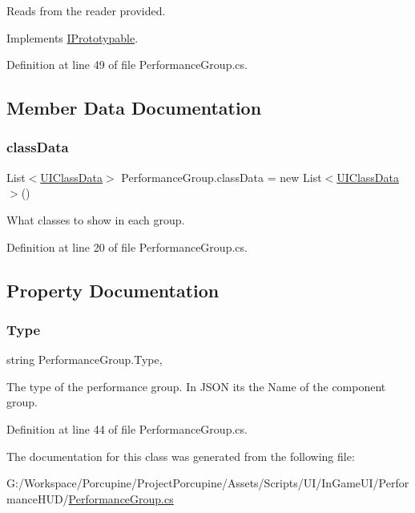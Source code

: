 Reads from the reader provided. 



Implements \hyperlink{interface_i_prototypable_a024d752c4be655a7166db5718f1fad6a}{I\+Prototypable}.



Definition at line 49 of file Performance\+Group.\+cs.



\subsection{Member Data Documentation}
\mbox{\label{class_performance_group_a95898308ffc858a8fc045380952234a7}} 
\subsubsection{\texorpdfstring{class\+Data}{classData}}
{\footnotesize\ttfamily List$<$\hyperlink{struct_u_i_class_data}{U\+I\+Class\+Data}$>$ Performance\+Group.\+class\+Data = new List$<$\hyperlink{struct_u_i_class_data}{U\+I\+Class\+Data}$>$()}



What classes to show in each group. 



Definition at line 20 of file Performance\+Group.\+cs.



\subsection{Property Documentation}
\mbox{\label{class_performance_group_a05385bccfa54530d1232ee250c3df825}} 
\subsubsection{\texorpdfstring{Type}{Type}}
{\footnotesize\ttfamily string Performance\+Group.\+Type\hspace{0.3cm}{\ttfamily [get]}, {\ttfamily [set]}}



The type of the performance group. In J\+S\+ON its the \textquotesingle{}Name\textquotesingle{} of the component group. 



Definition at line 44 of file Performance\+Group.\+cs.



The documentation for this class was generated from the following file\+:\begin{DoxyCompactItemize}
\item 
G\+:/\+Workspace/\+Porcupine/\+Project\+Porcupine/\+Assets/\+Scripts/\+U\+I/\+In\+Game\+U\+I/\+Performance\+H\+U\+D/\hyperlink{_performance_group_8cs}{Performance\+Group.\+cs}\end{DoxyCompactItemize}
